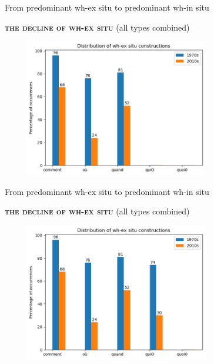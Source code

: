 \documentclass[lesson_slides]{subfiles}
\begin{document}
\begin{frame}[c]{From predominant wh-ex situ to predominant wh-in situ}

    \textbf{\textsc{the decline of wh-ex situ}} (all types combined)
    \begin{center}
        \includegraphics[width=10cm, height=6cm]{images/exsitu3.png}
    \end{center}
  
\end{frame}
\begin{frame}[c]{From predominant wh-ex situ to predominant wh-in situ}

    \textbf{\textsc{the decline of wh-ex situ}} (all types combined)
    \begin{center}
        \includegraphics[width=10cm, height=6cm]{images/exsitu4.png}
    \end{center}
  
\end{frame}
\end{document}
